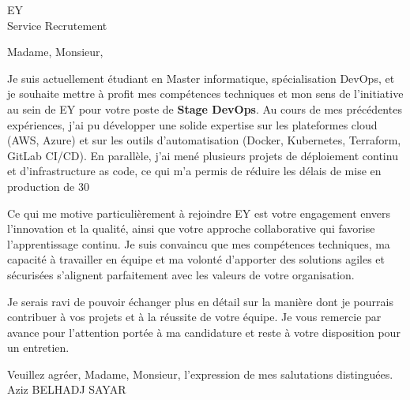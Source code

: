 \documentclass[11pt,a4paper]{letter}
\date{\TodayDate}
\newcommand{\CandidateName}{Aziz BELHADJ SAYAR}
\newcommand{\CompanyName}{EY}
\newcommand{\Position}{Stage DevOps}
\begin{document}
\begin{letter}{\textcolor{accent}{\CompanyName} \\ Service Recrutement}

\opening{Madame, Monsieur,}

Je suis actuellement étudiant en Master informatique, spécialisation DevOps, et je souhaite mettre à profit mes compétences techniques et mon sens de l’initiative au sein de \textcolor{accent}{\CompanyName} pour votre poste de \textbf{\Position}.  
Au cours de mes précédentes expériences, j’ai pu développer une solide expertise sur les plateformes cloud (AWS, Azure) et sur les outils d’automatisation (Docker, Kubernetes, Terraform, GitLab CI/CD). En parallèle, j’ai mené plusieurs projets de déploiement continu et d’infrastructure as code, ce qui m’a permis de réduire les délais de mise en production de 30 %

Ce qui me motive particulièrement à rejoindre \textcolor{accent}{\CompanyName} est votre engagement envers l’innovation et la qualité, ainsi que votre approche collaborative qui favorise l’apprentissage continu. Je suis convaincu que mes compétences techniques, ma capacité à travailler en équipe et ma volonté d’apporter des solutions agiles et sécurisées s’alignent parfaitement avec les valeurs de votre organisation.

Je serais ravi de pouvoir échanger plus en détail sur la manière dont je pourrais contribuer à vos projets et à la réussite de votre équipe. Je vous remercie par avance pour l’attention portée à ma candidature et reste à votre disposition pour un entretien.

\closing{Veuillez agréer, Madame, Monsieur, l’expression de mes salutations distinguées.\\[1ex] \CandidateName}

\end{letter}
\end{document}
